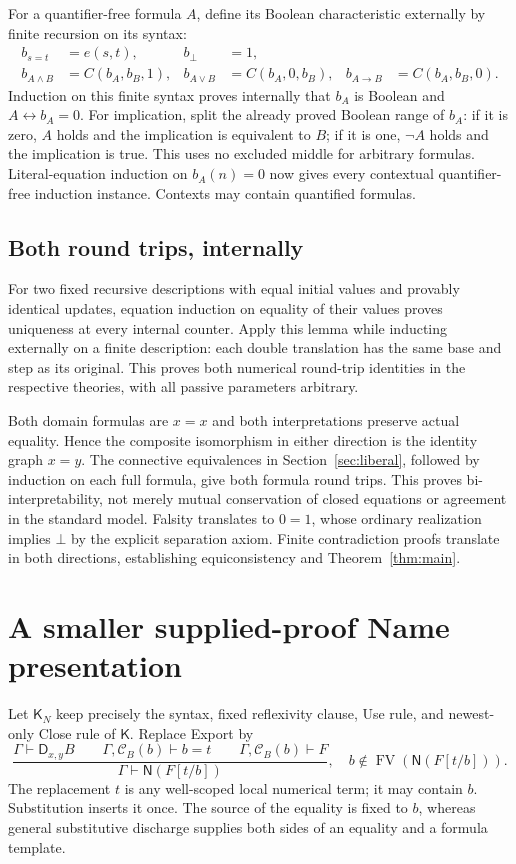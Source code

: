 \documentclass[11pt,letterpaper]{article}
\theoremstyle{definition}\newtheorem{definition}[theorem]{Definition}
\theoremstyle{remark}\newtheorem{remark}[theorem]{Remark}
\newcommand{\K}{\mathsf K}
\newcommand{\KN}{\mathsf K_{\!N}}
\newcommand{\NF}{\mathsf N}
\newcommand{\DD}{\mathsf D}
\newcommand{\FV}{\operatorname{FV}}
\begin{document}
For a quantifier-free formula $A$, define its Boolean characteristic
externally by finite recursion on its syntax:
\begin{align*}
 b_{s=t}&=e(s,t),&b_\bot&=1,\\
 b_{A\land B}&=C(b_A,b_B,1),&
 b_{A\lor B}&=C(b_A,0,b_B),&
 b_{A\to B}&=C(b_A,b_B,0).
\end{align*}
Induction on this finite syntax proves internally that $b_A$ is Boolean
and $A\leftrightarrow b_A=0$. For implication, split the already proved
Boolean range of $b_A$: if it is zero, $A$ holds and the implication
is equivalent to $B$; if it is one, $\neg A$ holds and the implication
is true. This uses no excluded middle for arbitrary formulas.
Literal-equation induction on $b_A(n)=0$ now gives every contextual
quantifier-free induction instance. Contexts may contain quantified
formulas.

\subsection{Both round trips, internally}
For two fixed recursive descriptions with equal initial values and
provably identical updates, equation induction on equality of their
values proves uniqueness at every internal counter. Apply this lemma
while inducting externally on a finite description: each double
translation has the same base and step as its original. This proves
both numerical round-trip identities in the respective theories, with
all passive parameters arbitrary.

Both domain formulas are $x=x$ and both interpretations preserve actual
equality. Hence the composite isomorphism in either direction is the
identity graph $x=y$. The connective equivalences in
Section~\ref{sec:liberal}, followed by induction on each full formula,
give both formula round trips. This proves bi-interpretability, not
merely mutual conservation of closed equations or agreement in the
standard model. Falsity translates to $0=1$, whose ordinary realization
implies $\bot$ by the explicit separation axiom. Finite contradiction
proofs translate in both directions, establishing equiconsistency and
Theorem~\ref{thm:main}.

\section{A smaller supplied-proof Name presentation}\label{sec:name}
Let $\KN$ keep precisely the syntax, fixed reflexivity clause, Use rule,
and newest-only Close rule of $\K$. Replace Export by
\[
 \frac{\Gamma\vdash\DD_{x,y}B\qquad
       \Gamma,\mathcal C_B(b)\vdash b=t\qquad
       \Gamma,\mathcal C_B(b)\vdash F}
      {\Gamma\vdash\NF(F[t/b])},
 \quad b\notin\FV(\NF(F[t/b])).
 \tag{Name}
\]
The replacement $t$ is any well-scoped local numerical term; it may
contain $b$. Substitution inserts it once. The source of the equality
is fixed to $b$, whereas general substitutive discharge supplies both
sides of an equality and a formula template.
\end{document}
